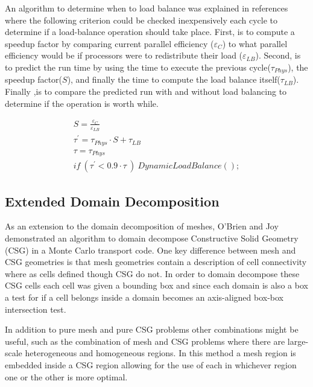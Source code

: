 An algorithm to determine when to load balance was explained in references~\cite{o2005dynamic}~\cite{procassini2005load} where the following criterion could be checked inexpensively each cycle to determine if a load-balance operation should take place.
%
First, is to compute a speedup factor by comparing current parallel efficiency ($ \varepsilon_C $) to what parallel efficiency would be if processors were to redistribute their load ($ \varepsilon_{LB} $).
%
Second, is to predict the run time by using the time to execute the previous cycle($ \tau_{Phys} $), the speedup factor($S$), and finally the time to compute the load balance itself($ \tau_{LB} $).
%
Finally ,is to compare the predicted run with and without load balancing to determine if the operation is worth while.~\cite{o2005dynamic}
~\cite{procassini2005load}

\begin{eqnarray}
S = \frac{\varepsilon_C}{\varepsilon_{LB}} \\
\tau^{'} = \tau_{Phys} \cdot S + \tau_{LB} \\
\tau = \tau_{Phys} \\
if\ (\tau^{'} < 0.9 \cdot \tau \ )\ DynamicLoadBalance();
\end{eqnarray}

\subsection*{Extended Domain Decomposition}

As an extension to the domain decomposition of meshes, O'Brien and Joy demonstrated an algorithm to domain decompose Constructive Solid Geometry (CSG) in a Monte Carlo transport code.
%
One key difference between mesh and CSG geometries is that mesh geometries contain a description of cell connectivity where as cells defined though CSG do not.
%
In order to domain decompose these CSG cells each cell was given a bounding box and since each domain is also a box a test for if a cell belongs inside a domain becomes an axis-aligned box-box intersection test.~\cite{o2009domain}
%

In addition to pure mesh and pure CSG problems other combinations might be useful, such as the combination of mesh and CSG problems where there are large-scale heterogeneous and homogeneous regions.
%
In this method a mesh region is embedded inside a CSG region allowing for the use of each in whichever region one or the other is more optimal.
~\cite{greenman2009enhancements}


